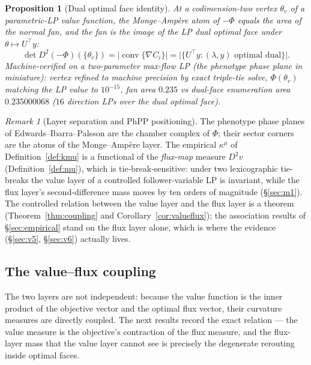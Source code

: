 \documentclass[11pt,a4paper]{article}
\theoremstyle{plain}
\newtheorem{proposition}[theorem]{Proposition}
\theoremstyle{definition}
\theoremstyle{remark}
\newtheorem{remark}[theorem]{Remark}
\newcommand{\kmu}{\kappa^{\mu}}
\begin{document}
\begin{proposition}[Dual optimal face identity]\label{prop:dualface}
At a codimension-two vertex $\theta_v$ of a parametric-LP value function,
the Monge--Amp\`ere atom of $-\Phi$ equals the area of the normal fan, and
the fan is the image of the LP dual optimal face under
$\theta \mapsto U^\top y$:
\[
\det D^2(-\Phi)(\{\theta_v\})
= \bigl|\operatorname{conv}\{\nabla C_i\}\bigr|
= \bigl|\{U^\top y : (\lambda, y) \text{ optimal dual}\}\bigr|.
\]
Machine-verified on a two-parameter max-flow LP (the phenotype phase
plane in miniature): vertex refined to machine precision by exact
triple-tie solve, $\Phi(\theta_v)$ matching the LP value to
$10^{-15}$, fan area $0.235$ vs dual-face enumeration area
$0.235000068$ ($16$ direction LPs over the dual optimal face).
\end{proposition}

\begin{remark}[Layer separation and PhPP positioning]\label{rem:layersep}
The phenotype phase planes of Edwards--Ibarra--Palsson
\citep{edwards2001, ibarra2002} are the chamber
complex of $\Phi$; their sector corners are the atoms of the
Monge--Amp\`ere layer. The empirical $\kmu$ of
Definition~\ref{def:kmu} is a functional of the \emph{flux-map} measure
$D^2 v$ (Definition~\ref{def:mu}), which is tie-break-sensitive: under
two lexicographic tie-breaks the value layer of a controlled
follower-variable LP is invariant, while the flux layer's
second-difference mass moves by ten orders of magnitude (\S\ref{sec:m1}). The
controlled relation between the value layer and the flux layer is
a theorem (Theorem~\ref{thm:coupling} and
Corollary~\ref{cor:valueflux}); the association results of
\S\ref{sec:empirical} stand on the flux layer alone, which is where
the evidence (\S\ref{sec:v5}, \S\ref{sec:v6}) actually lives.
\end{remark}

\subsection{The value--flux coupling}

The two layers are not independent: because the value function is the
inner product of the objective vector and the optimal flux vector,
their curvature measures are directly coupled. The next results
record the exact relation --- the value measure is the objective's
contraction of the flux measure, and the flux-layer mass that the value
layer cannot see is precisely the degenerate rerouting inside optimal
faces.
\end{document}
